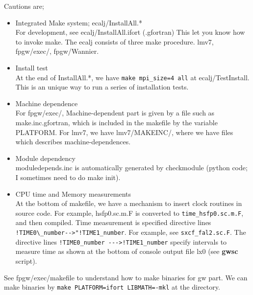 \documentclass[a4paper,10pt,epsf,fleqn]{article}
\newcommand{\exe}[1]{{\bf #1}}
\newcommand{\io}[1]{{\sf  #1}}
\begin{document}
Cautions are;
\begin{itemize}
\item 
Integrated Make system; \io{ecalj/InstallAll.*}\\
For development, see ecalj/InstallAll.ifort (.gfortran)
This let you know how to invoke make.
The ecalj consists of three make procedure.
lmv7, fpgw/exec/, fpgw/Wannier.
\item Install test\\
At the end of \io{InstallAll.*}, we have \verb#make mpi_size=4 all# at
ecalj/TestInstall. This is an unique way to run 
a series of installation tests.
\item
Machine dependence\\
For fpgw/exec/, Machine-dependent part is given by
a file such as make.inc.gfortran, which is included
in the makefile by the variable PLATFORM.
For \io{lmv7}, we have \io{lmv7/MAKEINC/},
where we have files which describes machine-dependences. 
\item
Module dependency\\
moduledepends.inc is automatically generated by checkmodule (python code; I sometimes need to do make init).
\item CPU time and Memory measurements\\
At the bottom of makefile, we have a mechanism
to insert clock routines in source code.
For example, hsfp0.sc.m.F is converted to
\verb#time_hsfp0.sc.m.F#, and then compiled.
Time measurement is specified directive lines 
\verb#!TIME0\_number-->"!TIME1_number#. For example,
see \verb#sxcf_fal2.sc.F#. The directive lines 
\verb#!TIME0_number --->!TIME1_number# specify intervals to measure time
as shown at the bottom of console output file \io{lx0} (see \exe{gwsc} script).

\end{itemize}
See \io{fpgw/exec/makefile} to understand how to make binaries for gw part.
We can make binaries by \verb#make PLATFORM=ifort LIBMATH=-mkl# at the directory.\\
\end{document}
